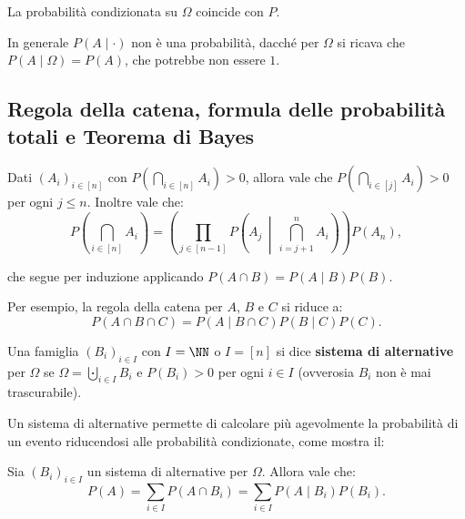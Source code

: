 \begin{multicols*}{2}
    \begin{remark}
        La probabilità condizionata su $\Omega$ coincide con $P$.
    \end{remark}

    \begin{remark}
        In generale $P(A \mid \cdot)$ non è una probabilità, dacché
        per $\Omega$ si ricava che $P(A \mid \Omega) = P(A)$, che
        potrebbe non essere $1$.
    \end{remark}

    \subsection{Regola della catena, formula delle probabilità totali e Teorema di Bayes}

    \begin{lemma}
        Dati $(A_i)_{i \in [n]}$ con $P(\bigcap_{i \in [n]} A_i) > 0$, allora vale che
        $P(\bigcap_{i \in [j]} A_i) > 0$ per ogni $j \leq n$. Inoltre vale che:
        \[ P\left(\bigcap_{i \in [n]} A_i\right) = \left(\prod_{j \in [n-1]} P\left(A_j \,\middle\vert\, \bigcap_{i=j+1}^{n} A_i\right)\right) P(A_n), \]

        che segue per induzione applicando $P(A \cap B) = P(A \mid B) P(B)$.
    \end{lemma}

    \begin{remark}
        Per esempio, la regola della catena per $A$, $B$ e $C$ si riduce
        a:
        \[
            P(A \cap B \cap C) = P(A \mid B \cap C) P(B \mid C) P(C).
        \]
    \end{remark}

    \begin{definition}
        Una famiglia $(B_i)_{i \in I}$ con $I = \NN$ o
        $I = [n]$ si dice \textbf{sistema di alternative}
        per $\Omega$ se $\Omega = \bigcupdot_{i \in I} B_i$
        e $P(B_i) > 0$ per ogni $i \in I$ (ovverosia
        $B_i$ non è mai trascurabile).
    \end{definition}

    Un sistema di alternative permette di calcolare più agevolmente
    la probabilità di un evento riducendosi alle probabilità
    condizionate, come mostra il:

    \begin{lemma}
        Sia $(B_i)_{i \in I}$ un sistema di alternative per $\Omega$. Allora vale
        che:
        \[ 
            P(A) = \sum_{i \in I} P(A \cap B_i) = \sum_{i \in I} P(A \mid B_i) P(B_i).
        \]
    \end{lemma}


\end{multicols*}
